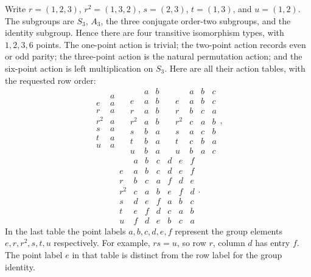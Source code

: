 Write $r=(1,2,3)$, $r^2=(1,3,2)$, $s=(2,3)$, $t=(1,3)$, and $u=(1,2)$.
The subgroups are $S_3$, $A_3$, the three conjugate order-two subgroups,
and the identity subgroup. Hence there are four transitive isomorphism
types, with $1,2,3,6$ points. The one-point action is trivial; the two-point
action records even or odd parity; the three-point action is the natural
permutation action; and the six-point action is left multiplication on $S_3$.
Here are all their action tables, with the requested row order:
\[
\begin{array}{c|c}&a\\\hline e&a\\r&a\\r^2&a\\s&a\\t&a\\u&a\end{array}
\quad
\begin{array}{c|cc}&a&b\\\hline e&a&b\\r&a&b\\r^2&a&b\\s&b&a\\t&b&a\\u&b&a\end{array}
\quad
\begin{array}{c|ccc}&a&b&c\\\hline
e&a&b&c\\r&b&c&a\\r^2&c&a&b\\s&a&c&b\\t&c&b&a\\u&b&a&c
\end{array},
\]
\[
\begin{array}{c|cccccc}&a&b&c&d&e&f\\\hline
e&a&b&c&d&e&f\\r&b&c&a&f&d&e\\r^2&c&a&b&e&f&d\\
s&d&e&f&a&b&c\\t&e&f&d&c&a&b\\u&f&d&e&b&c&a
\end{array}.
\]
In the last table the point labels $a,b,c,d,e,f$ represent the group
elements $e,r,r^2,s,t,u$ respectively. For example, $rs=u$, so row $r$,
column $d$ has entry $f$. The point label $e$ in that table is distinct
from the row label for the group identity.
